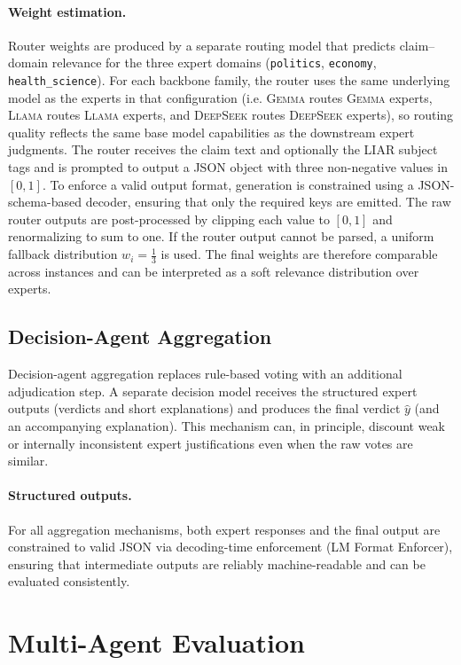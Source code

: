 \paragraph{Weight estimation.}
Router weights are produced by a separate routing model that predicts claim--domain relevance for the three expert domains (\texttt{politics}, \texttt{economy}, \texttt{health\_science}).
For each backbone family, the router uses the same underlying model as the experts in that configuration (i.e. \textsc{Gemma} routes \textsc{Gemma} experts, \textsc{Llama} routes \textsc{Llama} experts, and \textsc{DeepSeek} routes \textsc{DeepSeek} experts), so routing quality reflects the same base model capabilities as the downstream expert judgments.
The router receives the claim text and optionally the LIAR subject tags and is prompted to output a JSON object with three non-negative values in $[0,1]$.
To enforce a valid output format, generation is constrained using a JSON-schema-based decoder, ensuring that only the required keys are emitted.
The raw router outputs are post-processed by clipping each value to $[0,1]$ and renormalizing to sum to one.
If the router output cannot be parsed, a uniform fallback distribution $w_i=\tfrac{1}{3}$ is used.
The final weights are therefore comparable across instances and can be interpreted as a soft relevance distribution over experts.

\subsection{Decision-Agent Aggregation}
Decision-agent aggregation replaces rule-based voting with an additional adjudication step. A separate decision model receives the structured expert outputs (verdicts and short explanations) and produces the final verdict $\hat{y}$ (and an accompanying explanation). This mechanism can, in principle, discount weak or internally inconsistent expert justifications even when the raw votes are similar.

\paragraph{Structured outputs.} 
For all aggregation mechanisms, both expert responses and the final output are constrained to valid JSON via decoding-time enforcement (LM Format Enforcer), ensuring that intermediate outputs are reliably machine-readable and can be evaluated consistently.

\section{Multi-Agent Evaluation}

